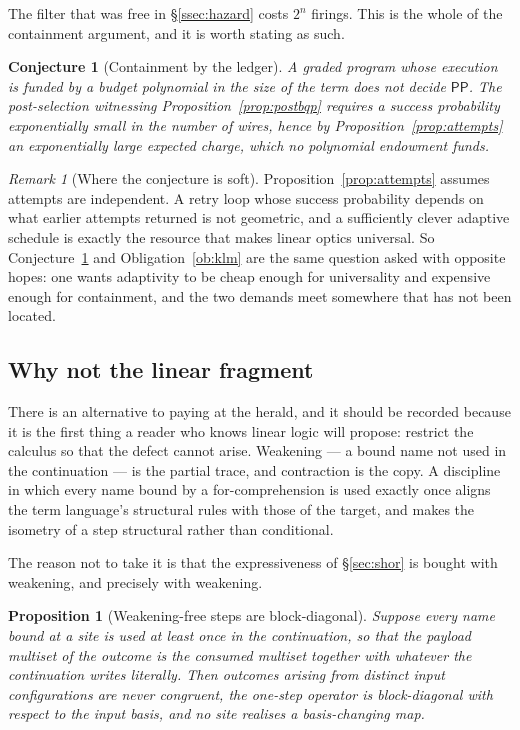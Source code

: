 \documentclass[11pt,a4paper]{article}
\theoremstyle{plain}
\newtheorem{proposition}[theorem]{Proposition}
\newtheorem{conjecture}[theorem]{Conjecture}
\theoremstyle{definition}
\theoremstyle{remark}
\newtheorem{remark}[theorem]{Remark}
\begin{document}
The filter that was free in \S\ref{ssec:hazard} costs $2^{n}$ firings. This is
the whole of the containment argument, and it is worth stating as such.

\begin{conjecture}[Containment by the ledger]\label{conj:ledger}
A graded program whose execution is funded by a budget polynomial in the size of
the term does not decide $\mathsf{PP}$. The post-selection witnessing
Proposition~\ref{prop:postbqp} requires a success probability exponentially small
in the number of wires, hence by Proposition~\ref{prop:attempts} an
exponentially large expected charge, which no polynomial endowment funds.
\end{conjecture}

\begin{remark}[Where the conjecture is soft]\label{rem:adaptive}
Proposition~\ref{prop:attempts} assumes attempts are independent. A retry loop
whose success probability depends on what earlier attempts returned is not
geometric, and a sufficiently clever adaptive schedule is exactly the resource
that makes linear optics universal. So Conjecture~\ref{conj:ledger} and
Obligation~\ref{ob:klm} are the same question asked with opposite hopes: one
wants adaptivity to be cheap enough for universality and expensive enough for
containment, and the two demands meet somewhere that has not been located.
\end{remark}

\subsection{Why not the linear fragment}\label{ssec:linear}

There is an alternative to paying at the herald, and it should be recorded
because it is the first thing a reader who knows linear logic will propose:
restrict the calculus so that the defect cannot arise. Weakening --- a bound name
not used in the continuation --- is the partial trace, and contraction is the
copy. A discipline in which every name bound by a for-comprehension is used
exactly once aligns the term language's structural rules with those of the
target, and makes the isometry of a step structural rather than conditional.

The reason not to take it is that the expressiveness of \S\ref{sec:shor} is
bought with weakening, and precisely with weakening.

\begin{proposition}[Weakening-free steps are block-diagonal]\label{prop:blockdiag}
Suppose every name bound at a site is used at least once in the continuation, so
that the payload multiset of the outcome is the consumed multiset together with
whatever the continuation writes literally. Then outcomes arising from distinct
input configurations are never congruent, the one-step operator is block-diagonal
with respect to the input basis, and no site realises a basis-changing map.
\end{proposition}
\end{document}
